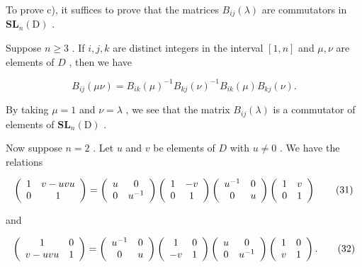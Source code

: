 To prove c), it suffices to prove that the matrices \(B_{ij}(\lambda)\) are commutators in \(\mathbf{SL}_n(\mathrm{D})\) .

Suppose \(n \geqslant 3\) . If \(i, j, k\) are distinct integers in the interval \([1, n]\) and \(\mu, \nu\) are elements of \(D\) , then we have

\[
B _ {i j} (\mu \nu) = B _ {i k} (\mu) ^ {- 1} B _ {k j} (\nu) ^ {- 1} B _ {i k} (\mu) B _ {k j} (\nu).\tag{30}
\]

By taking \(\mu = 1\) and \(\nu = \lambda\) , we see that the matrix \(B_{ij}(\lambda)\) is a commutator of elements of \(\mathbf{SL}_n(\mathrm{D})\) .

Now suppose \(n = 2\) . Let \(u\) and \(v\) be elements of \(D\) with \(u \neq 0\) . We have the relations

\[
\left( \begin{array}{c c} 1 & v - u v u \\ 0 & 1 \end{array} \right) = \left( \begin{array}{c c} u & 0 \\ 0 & u ^ {- 1} \end{array} \right) \left( \begin{array}{c c} 1 & - v \\ 0 & 1 \end{array} \right) \left( \begin{array}{c c} u ^ {- 1} & 0 \\ 0 & u \end{array} \right) \left( \begin{array}{c c} 1 & v \\ 0 & 1 \end{array} \right)\tag{31}
\]

and

\[
\left( \begin{array}{c c} 1 & 0 \\ v - u v u & 1 \end{array} \right) = \left( \begin{array}{c c} u ^ {- 1} & 0 \\ 0 & u \end{array} \right) \left( \begin{array}{c c} 1 & 0 \\ - v & 1 \end{array} \right) \left( \begin{array}{c c} u & 0 \\ 0 & u ^ {- 1} \end{array} \right) \left( \begin{array}{c c} 1 & 0 \\ v & 1 \end{array} \right).\tag{32}
\]


